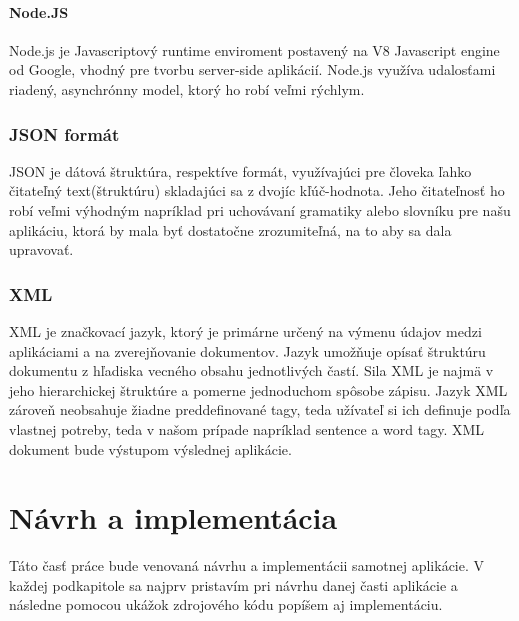 \documentclass[12pt,a4paper]{report}
\theoremstyle{definition}
\theoremstyle{remark}
\begin{document}
\subsubsection{Node.JS}
Node.js je Javascriptový runtime enviroment postavený na V8 Javascript engine od Google, vhodný pre tvorbu server-side aplikácií. Node.js využíva udalosťami riadený, asynchrónny model, ktorý ho robí veľmi rýchlym.


\subsection{JSON formát}
JSON je dátová štruktúra, respektíve formát, využívajúci pre človeka ľahko čitateľný text(štruktúru) skladajúci sa z dvojíc kľúč-hodnota. Jeho čitateľnosť ho robí veľmi výhodným napríklad pri uchovávaní gramatiky alebo slovníku pre našu aplikáciu, ktorá by mala byť dostatočne zrozumiteľná, na to aby sa dala upravovať.


\subsection{XML}
XML je značkovací jazyk, ktorý je primárne určený na výmenu údajov medzi aplikáciami a na zverejňovanie dokumentov. Jazyk umožňuje opísať štruktúru dokumentu z hľadiska vecného obsahu jednotlivých častí. Sila XML je najmä v jeho hierarchickej štruktúre a pomerne jednoduchom spôsobe zápisu. Jazyk XML zároveň neobsahuje žiadne preddefinované tagy, teda užívateľ si ich definuje podľa vlastnej potreby, teda v našom prípade napríklad sentence a word tagy. XML dokument bude výstupom výslednej aplikácie.



\chapter{Návrh a implementácia}
Táto časť práce bude venovaná návrhu a implementácii samotnej aplikácie. V každej podkapitole sa najprv pristavím pri návrhu danej časti aplikácie a následne pomocou ukážok zdrojového kódu popíšem aj implementáciu.
\end{document}
